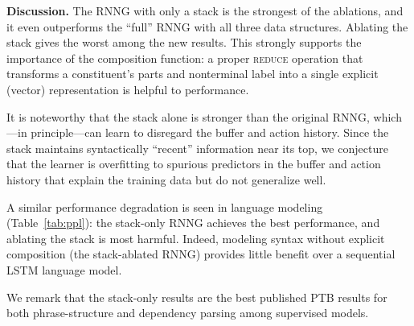 \documentclass[11pt]{article}
\begin{document}
\textbf{Discussion.}
The RNNG with only a stack is the strongest of the ablations, and it even outperforms the ``full'' RNNG with all three data structures.  Ablating the stack gives the worst among the new results.  This strongly supports the importance of the composition function:  a proper \textsc{reduce} operation that transforms a constituent's parts and nonterminal label into a single explicit (vector) representation is helpful to performance.

It is noteworthy that the stack alone is stronger than the original RNNG, which---in principle---can learn to disregard the buffer and action history.  Since the stack maintains syntactically ``recent'' information near its top, we conjecture that the learner is overfitting to spurious predictors in the buffer and action history that explain the training data but do not generalize well.

A similar performance degradation is seen in language modeling (Table~\ref{tab:ppl}):  the stack-only RNNG achieves the best performance, and ablating the stack is most harmful.  Indeed, modeling syntax without explicit composition (the stack-ablated RNNG) provides little benefit over a sequential LSTM language model.



\begin{table}[h]
\begin{center}
\end{center}
\caption{Language modeling:  perplexity. IKN refers to Kneser-Ney 5-gram LM.
\label{tab:ppl}}
\end{table}

 
We remark that the stack-only results are the best published PTB results for both phrase-structure and dependency parsing among supervised models.
 
\end{document}
